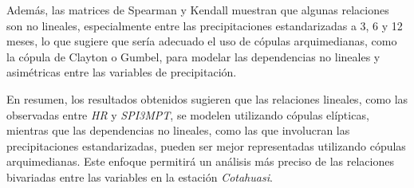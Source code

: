 Además, las matrices de Spearman y Kendall muestran que algunas relaciones son no lineales, especialmente entre las precipitaciones estandarizadas a 3, 6 y 12 meses, lo que sugiere que sería adecuado el uso de cópulas arquimedianas, como la cópula de Clayton o Gumbel, para modelar las dependencias no lineales y asimétricas entre las variables de precipitación.

En resumen, los resultados obtenidos sugieren que las relaciones lineales, como las observadas entre \textit{HR} y \textit{SPI3MPT}, se modelen utilizando cópulas elípticas, mientras que las dependencias no lineales, como las que involucran las precipitaciones estandarizadas, pueden ser mejor representadas utilizando cópulas arquimedianas. Este enfoque permitirá un análisis más preciso de las relaciones bivariadas entre las variables en la estación \textit{Cotahuasi}.


